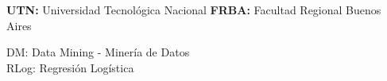 \textbf{UTN:} Universidad Tecnológica Nacional
\textbf{FRBA:} Facultad Regional Buenos Aires

DM: Data Mining - Minería de Datos\\

RLog: Regresión Logística


